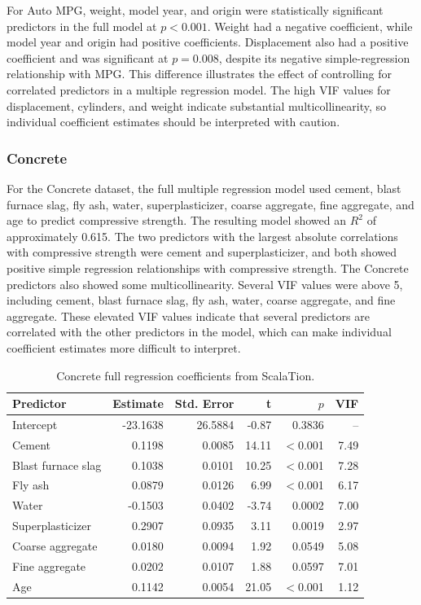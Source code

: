 \documentclass{article}
\begin{document}
For Auto MPG, weight, model year, and origin were statistically significant predictors in the full model at $p<0.001$. Weight had a negative coefficient, while model year and origin had positive coefficients. Displacement also had a positive coefficient and was significant at $p=0.008$, despite its negative simple-regression relationship with MPG. This difference illustrates the effect of controlling for correlated predictors in a multiple regression model. The high VIF values for displacement, cylinders, and weight indicate substantial multicollinearity, so individual coefficient estimates should be interpreted with caution.





\subsubsection{Concrete}

For the Concrete dataset, the full multiple regression model used cement, blast furnace slag, fly ash, water, superplasticizer, coarse aggregate, fine aggregate, and age to predict compressive strength. The resulting model showed an $R^2$ of approximately 0.615. The two predictors with the largest absolute correlations with compressive strength were cement and superplasticizer, and both showed positive simple regression relationships with compressive strength. The Concrete predictors also showed some multicollinearity. Several VIF values were above 5, including cement, blast furnace slag, fly ash, water, coarse aggregate, and fine aggregate. These elevated VIF values indicate that several predictors are correlated with the other predictors in the model, which can make individual coefficient estimates more difficult to interpret.

\begin{table}[H]
\centering
\small
\caption{Concrete full regression coefficients from ScalaTion.}
\label{tab:concrete-scalation-coefficients}
\begin{tabular}{lrrrrr}
\hline
Predictor & Estimate & Std. Error & t & $p$ & VIF \\
\hline
Intercept           & -23.1638 & 26.5884 & -0.87 & 0.3836   & -- \\
Cement              & 0.1198   & 0.0085  & 14.11 & $<$0.001 & 7.49 \\
Blast furnace slag  & 0.1038   & 0.0101  & 10.25 & $<$0.001 & 7.28 \\
Fly ash             & 0.0879   & 0.0126  & 6.99  & $<$0.001 & 6.17 \\
Water               & -0.1503  & 0.0402  & -3.74 & 0.0002   & 7.00 \\
Superplasticizer    & 0.2907   & 0.0935  & 3.11  & 0.0019   & 2.97 \\
Coarse aggregate    & 0.0180   & 0.0094  & 1.92  & 0.0549   & 5.08 \\
Fine aggregate      & 0.0202   & 0.0107  & 1.88  & 0.0597   & 7.01 \\
Age                 & 0.1142   & 0.0054  & 21.05 & $<$0.001 & 1.12 \\
\hline
\end{tabular}
\end{table}
\end{document}
